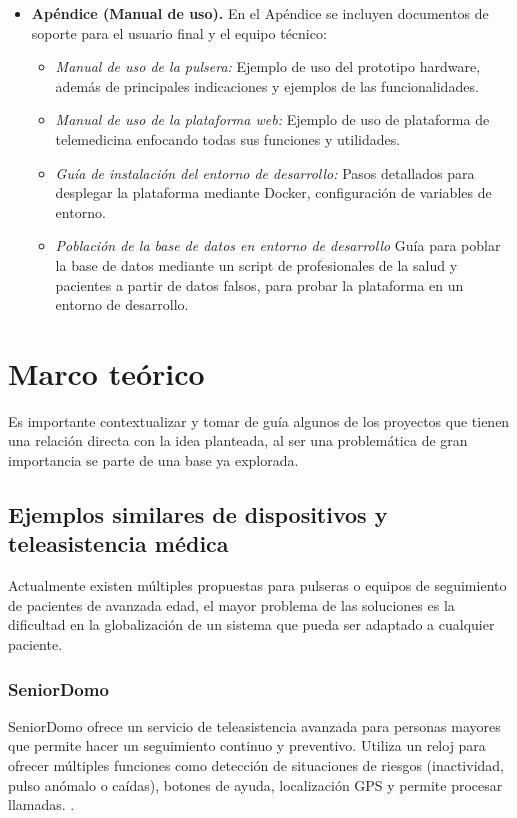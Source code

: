 \documentclass[12pt, a4paper]{article}
\begin{document}
\begin{itemize}
		\item \textbf{Apéndice (Manual de uso).}  
		En el Apéndice se incluyen documentos de soporte para el usuario final y el equipo técnico:
		\begin{itemize}
			\item \emph{Manual de uso de la pulsera:} Ejemplo de uso del prototipo hardware, además de principales indicaciones y ejemplos de las funcionalidades.  
			\item \emph{Manual de uso de la plataforma web:} Ejemplo de uso de plataforma de telemedicina enfocando todas sus funciones y utilidades. 
			\item \emph{Guía de instalación del entorno de desarrollo:} Pasos detallados para desplegar la plataforma mediante Docker, configuración de variables de entorno.
			\item \emph{Población de la base de datos en entorno de desarrollo} Guía para poblar la base de datos mediante un script de profesionales de la salud y pacientes a partir de datos falsos, para probar la plataforma en un entorno de desarrollo.
		\end{itemize}
	\end{itemize}
	

\section{Marco teórico}

	Es importante contextualizar y tomar de guía algunos de los proyectos que tienen una relación directa con la idea planteada, al ser una problemática de gran importancia se parte de una base ya explorada.

	\subsection{Ejemplos similares de dispositivos y teleasistencia médica}
	
	Actualmente existen múltiples propuestas para pulseras o equipos de seguimiento de pacientes de avanzada edad, el mayor problema de las soluciones es la dificultad en la globalización de un sistema que pueda ser adaptado a cualquier paciente.
	
	\subsubsection{SeniorDomo}
	
	SeniorDomo ofrece un servicio de teleasistencia avanzada para personas mayores que permite hacer un seguimiento continuo y preventivo. Utiliza un reloj para ofrecer múltiples funciones como detección de situaciones de riesgos (inactividad, pulso anómalo o caídas), botones de ayuda, localización GPS y permite procesar llamadas.  \cite{seniordomo}.
	
\end{document}

